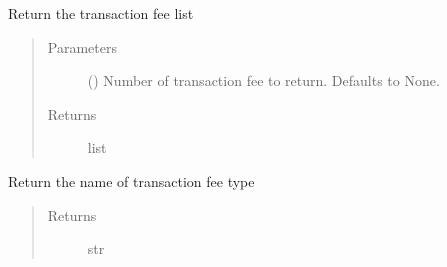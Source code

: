 \documentclass[letterpaper,10pt,english]{sphinxmanual}
\begin{document}
\begin{fulllineitems}

\begin{fulllineitems}
\label{\detokenize{DataLoader:crypto_env.dataloader.DataLoader.get_transaction_fee}}
\sphinxAtStartPar
Return the transaction fee list
\begin{quote}\begin{description}
\item[{Parameters}] \leavevmode
\sphinxAtStartPar
{} (\sphinxstyleliteralemphasis{\sphinxupquote{, }}) \textendash{} Number of transaction fee to return. Defaults to None.

\item[{Returns}] \leavevmode
\sphinxAtStartPar
list

\end{description}\end{quote}

\end{fulllineitems}


\begin{fulllineitems}
\label{\detokenize{DataLoader:crypto_env.dataloader.DataLoader.get_transaction_fee_type}}
\sphinxAtStartPar
Return the name of transaction fee type
\begin{quote}\begin{description}
\item[{Returns}] \leavevmode
\sphinxAtStartPar
str

\end{description}\end{quote}

\end{fulllineitems}



\end{fulllineitems}
\end{document}
